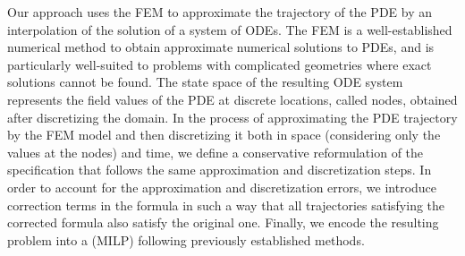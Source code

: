 \documentclass[letterpaper, 10 pt, conference]{ieeeconf/ieeeconf}
\begin{document}
%



Our approach uses the FEM to
approximate the trajectory of the PDE by an interpolation of the solution of a
system of ODEs. The FEM is a well-established
numerical method to obtain approximate numerical solutions to PDEs, and is particularly
well-suited to problems with complicated
geometries where exact solutions cannot be found. The state space of the
resulting ODE system represents the field values of the PDE at discrete 
locations, called nodes, obtained after discretizing the domain.
In the process of approximating the PDE trajectory by the FEM model and then
discretizing it both in space (considering only the values at the nodes) and time, 
we define a conservative
reformulation of the specification that follows the same approximation and
discretization steps. In order to account for the approximation and
discretization errors, we introduce correction terms in the formula in such a way
that all trajectories satisfying the corrected formula also satisfy the
original one. Finally, we encode the resulting problem into a (MILP) 
following previously established methods.
\end{document}

